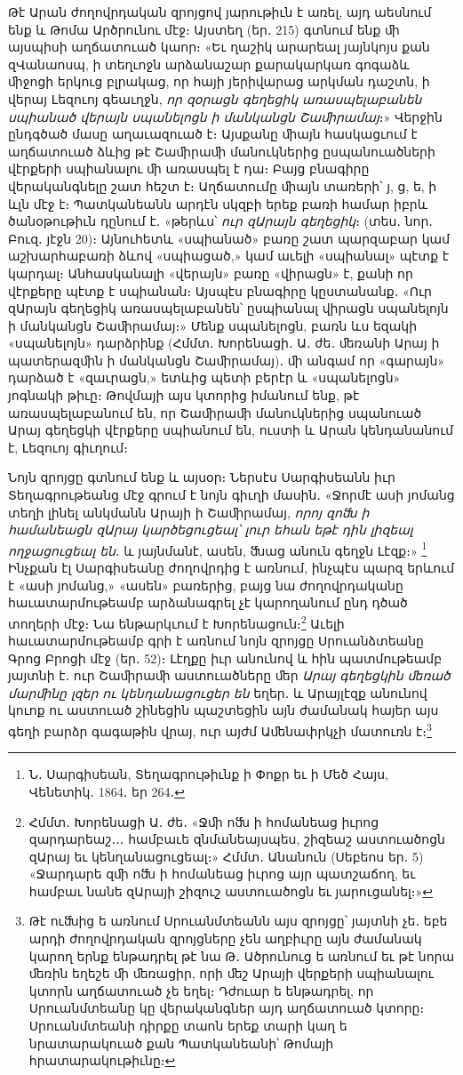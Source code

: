 \documentclass{article}
\begin{document}
{Թէ Արան ժողովրդական զրոյցով յարութիւն է առել, այդ աեսնում ենք և Թոմա Արծրունու մէջ։ Այստեղ (եր․ 215) գտնում ենք ﬕ այսպիսի աղճատուած կաոր։ «Եւ ղաշիկ արարեալ յայնկոյս քան զՎանաոսպ, ի տեղւոջն արձանաշար քարակարկառ գոգաձև ﬕջոցի երկուց բլրակաց, որ հայի յերիվարաց արկման դաշտն, ի վերայ Լեզուոյ գեաւղջն, \emph{որ զօրացն գեղեցիկ առասպելաբանեն սպիանած վերայն սպանելոցն ի մանկանցն Շաﬕրամայ}։» Վերջին ընդգծած մասը աղաւազուած է։ Այսքանը ﬕայն հասկացւում է աղճատուած ձևից թէ Շաﬕրաﬕ մանուկներից ըսպանուածների վէրքերի սպիանալու ﬕ առասպել է դա։ Բայց բնագիրը վերականգնելը շատ հեշտ է։ Աղճատումը ﬕայն տառերի՝ յ, ց, ե, ի ևլն մէջ է։ Պատկանեանն արդէն սկզբի երեք բառի համար իբրև ծանօթութիւն դընում է․ «թերևս՝ \emph{ուր զԱրայն գեղեցիկ}։ (տես․ նոր․ Բուզ․ յէջն 20)։ Այնուհետև «սպիանած» բառը շատ պարզաբար կամ աշխարհաբառի ձևով «սպիացած,» կամ աւելի «սպիանալ» պէտք է կարդալ։ Անհասկանալի «վերայն» բառը «վիրացն» է, քանի որ վէրքերը պէտք է սպիանան։ Այսպէս բնագիրը կըստանանք․ «Ուր զԱրայն գեղեցիկ առասպելաբանեն՝ ըսպիանալ վիրացն սպանելոյն ի մանկանցն Շաﬕրամայ։» Մենք սպանելոցն, բառն ևս եզակի «սպանելոյն» դարձրինք (Հմմտ․ Խորենացի․ Ա․ ժե․ ﬔռանի Արայ ի պատերազﬕն ի մանկանցն Շաﬕրամայ)․ ﬕ անգամ որ «գարայն» դարձած է «զաւրացն,» ետևից պետի բերէր և «սպանելոցն» յոգնակի թիւը։ Թովմայի այս կտորից իմանում ենք, թէ առասպելաբանում են, որ Շաﬕրաﬕ մանուկներից սպանուած Արայ գեղեցկի վէրքերը սպիանում են, ուստի և Արան կենդանանում է, Լեզուոյ գիւղում։

Նոյն զրոյցը գտնում ենք և այսօր։ Ներսէս Սարգիսեանն իւր Տեղագրութեանց մէջ գրում է նոյն գիւղի մասին․ «Ջորմէ ասի յոմանց տեղի լինել անկմանն Արայի ի Շաﬕրամայ, \emph{որոյ զոﬓ ի համանեացն զԱրայ կարծեցուցեալ՝ լուր եհան եթէ դին լիզեալ ողջացուցեալ են}․ և յայնմանէ, ասեն, ﬓաց անուն գեղջն Լէզք։» \footnote{Ն․ Սարգիսեան, Տեղագրութիւնք ի Փոքր եւ ի Մեծ Հայս, Վենետիկ․ 1864․ եր 264․} Ինչքան էլ Սարգիսեանը ժողովրդից է առնում, ինչպէս պարզ երևում է «ասի յոմանց,» «ասեն» բառերից, բայց նա ժողովրդականը հաւատարմութեամբ արձանագրել չէ կարողանում ընդ դծած տողերի մէջ։ Նա ենթարկւում է Խորենացուն։\footnote{Հմմտ․ Խորենացի Ա․ ժե․ «Ջﬕ ոﬓ ի հոմանեաց իւրոց զարդարեաշ․․․ համբաւե զնմանեայսպես, շիզեաշ աստուածոցն զԱրայ եւ կենղանացուցեալ։» Հմմտ․ Անանուն (Սեբեոս եր․ 5) «Ջարդարե զﬕ ոﬓ ի հոմանեաց իւրոց այր պատշաճող, եւ համբաւ նանե զԱրայի շիզուշ աստուածոցն եւ յարուցանել։»} Աւելի հաւատարմութեամբ գրի է առնում նոյն զրոյցը Սրուանձտեանը Գրոց Բրոցի մէջ (եր․ 52)։ Լէղքը իւր անունով և հին պատմութեամբ յայտնի է․ ուր Շաﬕրաﬕ աստուածները ﬔր \emph{Արայ գեղեցկին ﬔռած մարﬕնը լզեր ու կենդանացուցեր են} եղեր․ և Արայլէզք անունով կուոք ու աստուած շինեցին պաշտեցին այն ժամանակ հայեր այս գեղի բարձր գագաթին վրայ, ուր այժմ Աﬔնափրկչի մատուռն է։\footnote{Թէ ուﬓից ե առնում Սրուանմտեանն այս զրոյցը՝ յայտնի չե․ եբե արդի ժողովրդական զրոյցները չեն աղբիւրը այն ժամանակ կարող երնք ենթադրել թէ նա Թ․ Ածրունուց ե առնում եւ թէ նորա ﬔռին եղեշե ﬕ ﬔռացիր, որի ﬔշ Արայի վերքերի սպիանալու կտորն աղճատուած չե եղել։ Դժուար ե ենթադրել, որ Սրուանմտեանը կը վերականգներ այդ աղճատուած կտորը։ Սրուանմտեանի դիրքը տաոն երեք տարի կաղ ե նրատարակուած քան Պատկանեանի՝ Թոմայի հրատարակութիւնը։}

}
\end{document}
